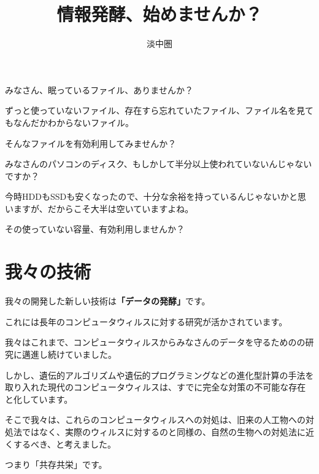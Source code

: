 \documentclass[12pt, unicode]{beamer}
\title{情報発酵、始めませんか？}
\author{淡中圏}
\date{}
\begin{document}
\frame{\titlepage}

\begin{frame}

みなさん、眠っているファイル、ありませんか？

ずっと使っていないファイル、存在すら忘れていたファイル、ファイル名を見てもなんだかわからないファイル。

\end{frame}
\begin{frame}

\Large
\centerline{そんなファイルを有効利用してみませんか？}

\end{frame}

\begin{frame}

みなさんのパソコンのディスク、もしかして半分以上使われていないんじゃないですか？

今時HDDもSSDも安くなったので、十分な余裕を持っているんじゃないかと思いますが、だからこそ大半は空いていますよね。

\end{frame}
\begin{frame}

\Large
\centerline{その使っていない容量、有効利用しませんか？}

\end{frame}

\section{我々の技術}

\begin{frame}

我々の開発した新しい技術は\textbf{「データの発酵」}です。

これには長年のコンピュータウィルスに対する研究が活かされています。

\end{frame}
\begin{frame}

我々はこれまで、コンピュータウィルスからみなさんのデータを守るためのの研究に邁進し続けていました。

しかし、遺伝的アルゴリズムや遺伝的プログラミングなどの進化型計算の手法を取り入れた現代のコンピュータウィルスは、すでに完全な対策の不可能な存在と化しています。

そこで我々は、これらのコンピュータウィルスへの対処は、旧来の人工物への対処法ではなく、実際のウィルスに対するのと同様の、自然の生物への対処法に近くするべき、と考えました。

{\Large
\centerline{つまり「共存共栄」です。}
}
\end{frame}
\end{document}
